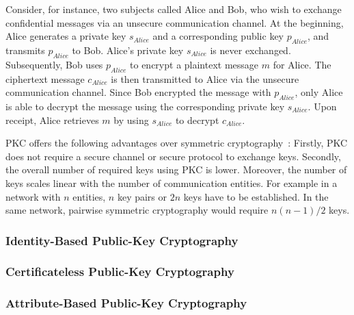 Consider, for instance, two subjects called Alice and Bob, who wish to exchange confidential messages via an unsecure communication channel.
At the beginning, Alice generates a private key $s_{Alice}$ and a corresponding public key $p_{Alice}$, and transmits $p_{Alice}$ to Bob.
Alice's private key $s_{Alice}$ is never exchanged.
Subsequently, Bob uses $p_{Alice}$ to encrypt a plaintext message $m$ for Alice.
The ciphertext message $c_{Alice}$ is then transmitted to Alice via the unsecure communication channel.
Since Bob encrypted the message with $p_{Alice}$, only Alice is able to decrypt the message using the corresponding private key $s_{Alice}$.
Upon receipt, Alice retrieves $m$ by using $s_{Alice}$ to decrypt $c_{Alice}$.

PKC offers the following advantages over symmetric cryptography~\cite{Barker2020,Eckert2023}:
Firstly, PKC does not require a secure channel or secure protocol to exchange keys.
Secondly, the overall number of required keys using PKC is lower.
Moreover, the number of keys scales linear with the number of communication entities.
For example in a network with $n$ entities, $n$ key pairs or $2n$ keys have to be established.
In the same network, pairwise symmetric cryptography would require $n(n-1)/2$ keys.

\subsubsection{Identity-Based Public-Key Cryptography}

\subsubsection{Certificateless Public-Key Cryptography}

\subsubsection{Attribute-Based Public-Key Cryptography}
